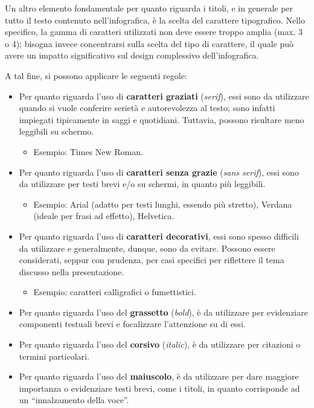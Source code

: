 \bigskip
\noindent Un altro elemento fondamentale per quanto riguarda i titoli, e in generale per tutto il testo contenuto nell'infografica, è la scelta del carattere tipografico. 
Nello specifico, la gamma di caratteri utilizzati non deve essere troppo amplia (max. 3 o 4); bisogna invece concentrarsi sulla scelta del tipo di carattere, il quale
può avere un impatto significativo sul design complessivo dell'infografica.

A tal fine, si possono applicare le seguenti regole:
\begin{itemize}
    \item Per quanto riguarda l'uso di \textbf{caratteri graziati} (\emph{serif}), essi sono da utilizzare quando si vuole conferire serietà e autorevolezza al testo; sono infatti impiegati tipicamente in saggi e quotidiani. 
    Tuttavia, possono risultare meno leggibili su schermo.
    \begin{itemize}
        \item Esempio: Times New Roman.
    \end{itemize}
    \item Per quanto riguarda l'uso di \textbf{caratteri senza grazie} (\emph{sans serif}), essi sono da utilizzare per testi brevi e/o su schermi, in quanto più leggibili.
    \begin{itemize}
        \item Esempio: Arial (adatto per testi lunghi, essendo più stretto), Verdana (ideale per frasi ad effetto), Helvetica.
    \end{itemize}
    \item Per quanto riguarda l'uso di \textbf{caratteri decorativi}, essi sono spesso difficili da utilizzare e generalmente, dunque, sono da evitare. Possono essere considerati, seppur con prudenza, per casi specifici per riflettere il tema discusso nella presentazione.
    \begin{itemize}
        \item Esempio: caratteri calligrafici o fumettistici.
    \end{itemize}
    \item Per quanto riguarda l'uso del \textbf{grassetto} (\emph{bold}), è da utilizzare per evidenziare componenti testuali brevi e focalizzare l'attenzione su di essi. 
    \item Per quanto riguarda l'uso del \textbf{corsivo} (\emph{italic}), è da utilizzare per citazioni o termini particolari.
    \item Per quanto riguarda l'uso del \textbf{maiuscolo}, è da utilizzare per dare maggiore importanza o evidenziare testi brevi, come i titoli, in quanto corrisponde ad un ``innalzamento della voce''.
\end{itemize}
